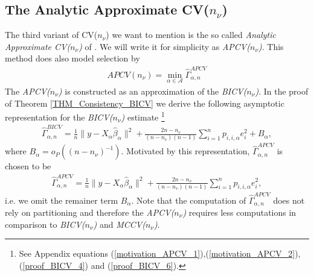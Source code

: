 \documentclass[Research_Module_ES.tex]{subfiles}
\begin{document}
\subsection{The Analytic Approximate CV($n_\nu$)}
The third variant of CV($n_\nu$) we want to mention is the so called \textit{Analytic Approximate CV($n_\nu$)} of \cite{shao}. We will write it for simplicity as \textit{APCV($n_\nu$)}. This method does also model selection by 
\begin{align*}
APCV(n_\nu)=\min_{\alpha\in\mathcal{A}}\hat{\Gamma}_{\alpha,n}^{APCV}
\end{align*}
The \textit{APCV($n_\nu$)} is constructed as an approximation of the \textit{BICV($n_\nu$)}. In the proof of Theorem \ref{THM_Consistency_BICV} we derive the following asymptotic representation for the \textit{BICV($n_\nu$)} estimate
\footnote{See Appendix  equations (\ref{motivation_APCV_1}),(\ref{motivation_APCV_2}),(\ref{proof_BICV_4}) and (\ref{proof_BICV_6}).}
\begin{align*}
\hat{\Gamma}_{\alpha,n}^{BICV}=\frac{1}{n}\lVert y-X_\alpha\hat{\beta}_\alpha\rVert^2 + \frac{2n-n_v}{(n-n_v)(n-1)}\sum_{i=1}^np_{i,i,\alpha}e_i^2 + B_\alpha,
\end{align*}
where $B_\alpha = o_P((n-n_\nu)^{-1})$. 
Motivated by this representation, $\hat{\Gamma}_{\alpha,n}^{APCV}$ is chosen to be
\begin{align*}
\hat{\Gamma}_{\alpha,n}^{APCV}=\frac{1}{n}\lVert y-X_\alpha\hat{\beta}_\alpha\rVert^2 + \frac{2n-n_v}{(n-n_v)(n-1)}\sum_{i=1}^np_{i,i,\alpha}e_i^2,
\end{align*}
i.e. we omit the remainer term $B_\alpha$.
Note that the computation of $\hat{\Gamma}_{\alpha,n}^{APCV}$ does not rely on partitioning and therefore the \textit{APCV($n_\nu$)} requires less computations in comparison to \textit{BICV($n_\nu$)} and \textit{MCCV($n_\nu$)}.
\end{document}

